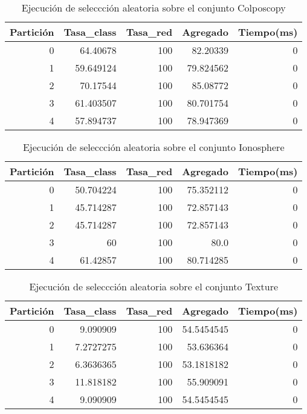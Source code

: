 \documentclass[size=a4, parskip=half, titlepage=false, toc=flat, toc=bib, 12pt]{scrartcl}
\begin{document}
 \begin{table}[ht]
  \centering
  \begin{tabular}[t]{rrrrr}
  \toprule
  Partición &Tasa\_class &Tasa\_red & Agregado & Tiempo(ms)\\
  \midrule
0         & 64.40678  & 100        & 82.20339  & 0      \\
1         & 59.649124 & 100        & 79.824562 & 0      \\
2         & 70.17544  & 100        & 85.08772  & 0      \\
3         & 61.403507 & 100        & 80.701754 & 0      \\
4         & 57.894737 & 100        & 78.947369 & 0      \\
  \bottomrule
  \end{tabular}
  \caption{Ejecución de seleccción aleatoria sobre el conjunto Colposcopy }
  \end{table}%

 \begin{table}[ht]
  \centering
  \begin{tabular}[t]{rrrrr}
  \toprule
  Partición &Tasa\_class &Tasa\_red & Agregado & Tiempo(ms)\\
  \midrule
0         & 50.704224 & 100        & 75.352112 & 0      \\
1         & 45.714287 & 100        & 72.857143 & 0      \\
2         & 45.714287 & 100        & 72.857143 & 0      \\
3         & 60        & 100        & 80.0      & 0      \\
4         & 61.42857  & 100        & 80.714285 & 0      \\
  \bottomrule
  \end{tabular}
  \caption{Ejecución de seleccción aleatoria sobre el conjunto Ionosphere}
  \end{table}%

 \begin{table}[ht]
  \centering
  \begin{tabular}[t]{rrrrr}
  \toprule
  Partición &Tasa\_class &Tasa\_red & Agregado & Tiempo(ms)\\
  \midrule
0         & 9.090909  & 100        & 54.5454545 & 0      \\
1         & 7.2727275 & 100        & 53.636364  & 0      \\
2         & 6.3636365 & 100        & 53.1818182 & 0      \\
3         & 11.818182 & 100        & 55.909091  & 0      \\
4         & 9.090909  & 100        & 54.5454545 & 0      \\
  \bottomrule
  \end{tabular}
  \caption{Ejecución de seleccción aleatoria sobre el conjunto Texture}
  \end{table}%
\end{document}
